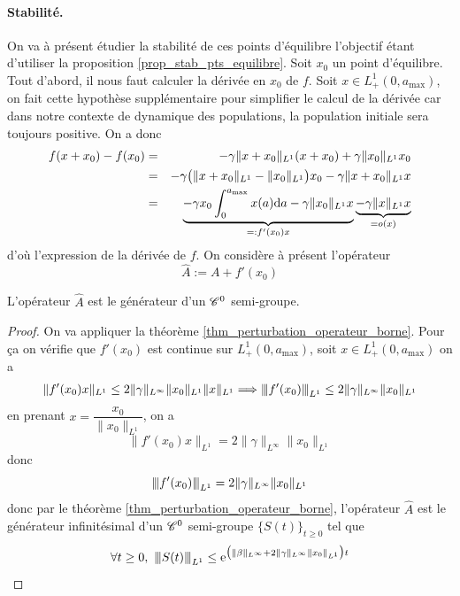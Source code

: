 \paragraph{Stabilité.} On va à présent étudier la stabilité de ces points d'équilibre l'objectif étant d'utiliser la proposition \ref{prop_stab_pts_equilibre}. Soit $x_0$ un point d'équilibre. Tout d'abord, il nous faut calculer la dérivée en $x_0$ de $f$. Soit $x \in L^1_+(0,a_{\max})$, on fait cette hypothèse supplémentaire pour simplifier le calcul de la dérivée car dans notre contexte de dynamique des populations, la population initiale sera toujours positive. On a donc
\begin{eqnarray*}
    f(x+x_0)-f(x_0) &=& -\gamma \|x+x_0\|_{L^1}(x+x_0)+\gamma \|x_0\|_{L^1}x_0 \\
    &=& -\gamma \big(\|x+x_0\|_{L^1}-\|x_0\|_{L^1}\big)x_0 -\gamma \|x+x_0\|_{L^1}x \\
    &=& \underbrace{-\gamma x_0\int_0^{a_{\max}}x(a)\mathrm{d} a - \gamma \|x_0\|_{L^1}x}_{=:f'(x_0)x} \underbrace{- \gamma \|x\|_{L^1}x}_{=o(x)}
\end{eqnarray*}
d'où l'expression de la dérivée de $f$. On considère à présent l'opérateur 
\begin{equation*}
    \hat{A} := A + f'(x_0)
\end{equation*}

\begin{proposition}
    L'opérateur $\hat{A}$ est le générateur d'un $\mathscr{C}^0$ semi-groupe.
\end{proposition}

\begin{proof}
    On va appliquer la théorème \ref{thm_perturbation_operateur_borne}. Pour ça on vérifie que $f'(x_0)$ est continue sur $L^1_+(0,a_{\max})$, soit $x \in L^1_+(0,a_{\max})$ on a 
    \begin{eqnarray*}
        \|f'(x_0)x\|_{L^1} \leq 2\|\gamma\|_{L^\infty}\|x_0\|_{L^1}\|x\|_{L^1} \Longrightarrow {\left\vert\kern-0.25ex\left\vert \kern-0.25ex\left\vert f'(x_0) \right\vert\kern-0.25ex\right\vert\kern-0.25ex\right\vert}_{L^1} \leq 2\|\gamma\|_{L^\infty}\|x_0\|_{L^1}
    \end{eqnarray*}
    en prenant $x=\dfrac{x_0}{\|x_0\|_{L^1}}$, on a 
    \begin{equation*}
        \|f'(x_0)x\|_{L^1} = 2\|\gamma\|_{L^\infty}\|x_0\|_{L^1}
    \end{equation*}
    donc 
    \begin{equation*}
        {\left\vert\kern-0.25ex\left\vert \kern-0.25ex\left\vert f'(x_0) \right\vert\kern-0.25ex\right\vert\kern-0.25ex\right\vert}_{L^1} = 2\|\gamma\|_{L^\infty}\|x_0\|_{L^1}
    \end{equation*}
    donc par le théorème \ref{thm_perturbation_operateur_borne}, l'opérateur $\hat{A}$ est le générateur infinitésimal d'un $\mathscr{C}^0$ semi-groupe $\big\{S(t)\big\}_{t \geq 0}$ tel que 
    \begin{equation*}
        \forall t \geq 0, \ \vertiii{S(t)}_{L^1} \leq \ex^{\big(\|\beta\|_{L^\infty}+ 2\|\gamma\|_{L^\infty}\|x_0\|_{L^1}\big)t}
    \end{equation*}
\end{proof}

